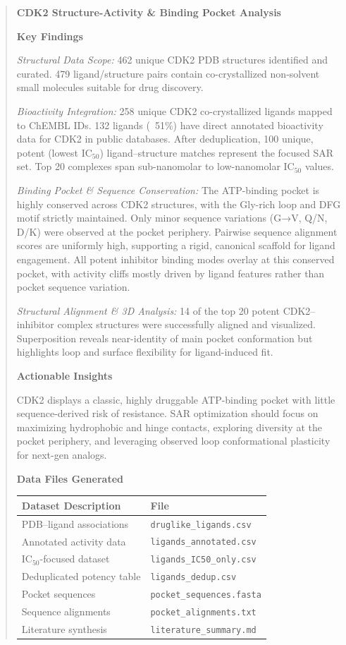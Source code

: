 \documentclass{article}
\begin{document}
\begin{quote}
\textbf{CDK2 Structure-Activity \& Binding Pocket Analysis}

\textbf{Key Findings}

\emph{Structural Data Scope:} 462 unique CDK2 PDB structures identified and curated. 479 ligand/structure pairs contain co-crystallized non-solvent small molecules suitable for drug discovery.

\emph{Bioactivity Integration:} 258 unique CDK2 co-crystallized ligands mapped to ChEMBL IDs. 132 ligands (~51\%) have direct annotated bioactivity data for CDK2 in public databases. After deduplication, 100 unique, potent (lowest IC$_{50}$) ligand–structure matches represent the focused SAR set. Top 20 complexes span sub-nanomolar to low-nanomolar IC$_{50}$ values.

\emph{Binding Pocket \& Sequence Conservation:} The ATP-binding pocket is highly conserved across CDK2 structures, with the Gly-rich loop and DFG motif strictly maintained. Only minor sequence variations (G→V, Q/N, D/K) were observed at the pocket periphery. Pairwise sequence alignment scores are uniformly high, supporting a rigid, canonical scaffold for ligand engagement. All potent inhibitor binding modes overlay at this conserved pocket, with activity cliffs mostly driven by ligand features rather than pocket sequence variation.

\emph{Structural Alignment \& 3D Analysis:} 14 of the top 20 potent CDK2–inhibitor complex structures were successfully aligned and visualized. Superposition reveals near-identity of main pocket conformation but highlights loop and surface flexibility for ligand-induced fit.

\textbf{Actionable Insights}

CDK2 displays a classic, highly druggable ATP-binding pocket with little sequence-derived risk of resistance. SAR optimization should focus on maximizing hydrophobic and hinge contacts, exploring diversity at the pocket periphery, and leveraging observed loop conformational plasticity for next-gen analogs.

\textbf{Data Files Generated}

\begin{center}
\scriptsize
\begin{tabular}{p{} p{}}
\toprule
\textbf{Dataset Description} & \textbf{File} \\
\midrule
PDB–ligand associations & \texttt{druglike\_ligands.csv} \\
Annotated activity data & \texttt{ligands\_annotated.csv} \\
IC$_{50}$-focused dataset & \texttt{ligands\_IC50\_only.csv} \\
Deduplicated potency table & \texttt{ligands\_dedup.csv} \\
Pocket sequences & \texttt{pocket\_sequences.fasta} \\
Sequence alignments & \texttt{pocket\_alignments.txt} \\
Literature synthesis & \texttt{literature\_summary.md} \\
\bottomrule
\end{tabular}
\end{center}


\end{quote}
\end{document}
